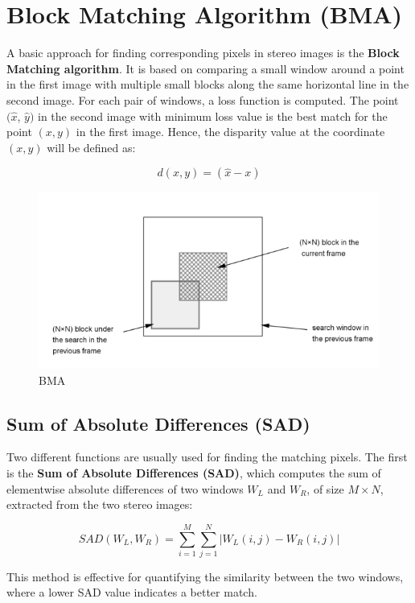 \documentclass[22pt]{report}
\begin{document}
    \section{Block Matching Algorithm (BMA)}
        A basic approach for finding corresponding pixels in stereo images is the \textbf{Block Matching algorithm}. It is based on comparing a small window around a point in the first image with multiple small blocks along the same horizontal line in the second image. For each pair of windows, a loss function is computed. The point $(\hat{x}$, $\hat{y})$ in the second image with minimum loss value is the best match for the point $(x, y)$ in the first image. Hence, the disparity value at the coordinate $(x, y)$ will be defined as:

        \[
        d(x, y) = (\hat{x} - x)
        \]

        \begin{figure}[h]
            \centering
            \includegraphics[width=0.5\linewidth]{Images/Block-matching_algorithm.png}
            \caption{BMA}
        \end{figure}
                
        \subsection{Sum of Absolute Differences (SAD)}
        
        Two different functions are usually used for finding the matching pixels. The first is the \textbf{Sum of Absolute Differences (SAD)}, which computes the sum of elementwise absolute differences of two windows \(W_L\) and \(W_R\), of size \(M \times N\), extracted from the two stereo images:
        
        \[
        SAD(W_L, W_R) = \sum_{i=1}^{M} \sum_{j=1}^{N} |W_L(i,j) - W_R(i,j)|
        \]
        
        This method is effective for quantifying the similarity between the two windows, where a lower SAD value indicates a better match.
\end{document}
